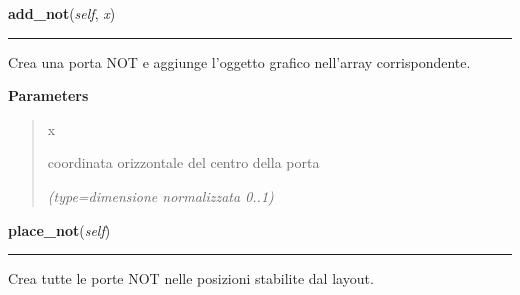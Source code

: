 \hspace{.8\funcindent}\begin{boxedminipage}{\funcwidth}

    \raggedright \textbf{add\_not}(\textit{self}, \textit{x})

    \vspace{-1.5ex}

    \rule{\textwidth}{0.5\fboxrule}
\setlength{\parskip}{2ex}
    Crea una porta NOT e aggiunge l'oggetto grafico nell'array 
    corrispondente.

\setlength{\parskip}{1ex}
      \textbf{Parameters}
      \vspace{-1ex}

      \begin{quote}
        \begin{Ventry}{x}

          \item[x]

          coordinata orizzontale del centro della porta

            {\it (type=dimensione normalizzata 0..1)}

        \end{Ventry}

      \end{quote}

    \end{boxedminipage}

    \label{pla:Pla:place_not}

    \vspace{0.5ex}

\hspace{.8\funcindent}\begin{boxedminipage}{\funcwidth}

    \raggedright \textbf{place\_not}(\textit{self})

    \vspace{-1.5ex}

    \rule{\textwidth}{0.5\fboxrule}
\setlength{\parskip}{2ex}
    Crea tutte le porte NOT nelle posizioni stabilite dal layout.

\setlength{\parskip}{1ex}
    \end{boxedminipage}

    \label{pla:Pla:place_inputs}

    \vspace{0.5ex}

